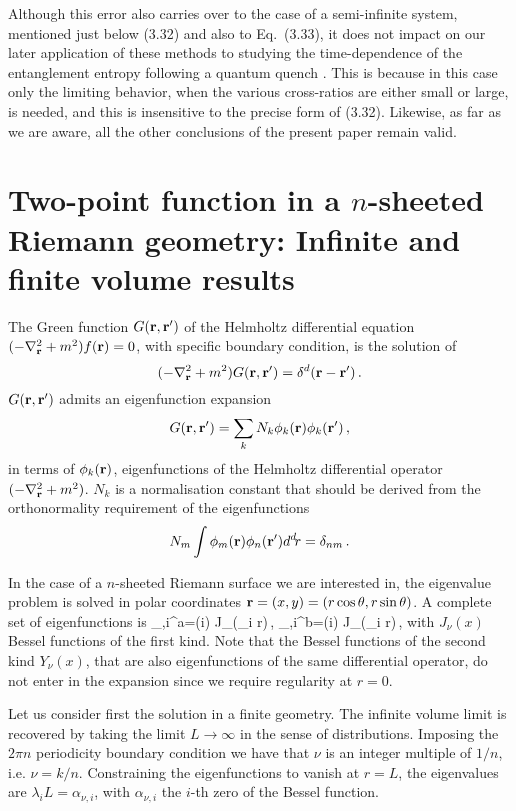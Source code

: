 \documentclass[12pt,aps,nofootinbib]{revtex4-1}
\begin{document}
Although this error also carries over to the case of a
semi-infinite system, mentioned just below (3.32) and also to
Eq.~(3.33), it does not impact on our later application of these
methods to studying the time-dependence of the entanglement
entropy following a quantum quench \cite{cc3}. This is because in
this case only the limiting behavior, when the various
cross-ratios are either small or large, is needed, and this is
insensitive to the precise form of (3.32). Likewise, as far as we
are aware, all the other conclusions of the present paper remain
valid.




\appendix

\section{Two-point function in a $n$-sheeted Riemann geometry:
Infinite and finite volume results}

The Green function $G({\bf r,r'})$ of the Helmholtz differential equation
$(-\nabla^2_{\bf r}+m^2)f({\bf r})=0$, with specific boundary condition,
is the solution of
$$
(-\nabla^2_{\bf r}+m^2)G({\bf r,r'})=\delta^d({\bf r-r'})\,.
$$
$G({\bf r,r'})$ admits an eigenfunction expansion
$$
G({\bf r,r'})=\sum_k N_k \phi_k({\bf r}) \phi_k({\bf r'})\,,
$$
in terms of $\phi_k({\bf r})$, eigenfunctions of the Helmholtz differential
operator $(-\nabla^2_{\bf r}+m^2)$.
$N_k$ is a  normalisation constant that should be derived from the
orthonormality requirement of the eigenfunctions
$$
N_m\int \phi_m({\bf r})\phi_n({\bf r'})d^d\!r=\delta_{nm}\,.
$$

In the case of a $n$-sheeted Riemann surface we are interested in,
the eigenvalue problem is solved in polar coordinates
${\bf r}=(x,y)=(r\cos\theta,r\sin\theta)$.
A complete set of eigenfunctions is
\be
\phi_{\nu,i}^a=\cos({i\nu \theta}) J_\nu(\lambda_i r)\,,\qquad
\phi_{\nu,i}^b=\sin({i\nu \theta}) J_\nu(\lambda_i r)\,,
\ee
with $J_\nu(x)$ Bessel functions of the first kind.
Note that the Bessel functions of the second kind $Y_\nu(x)$, that are also
eigenfunctions of the same differential operator, do not enter in
the expansion since we require regularity at $r=0$.

Let us consider first the solution in a finite geometry.
The infinite volume limit is recovered by taking the limit
$L\rightarrow \infty$ in the sense of distributions.
Imposing the $2\pi n$ periodicity boundary condition we have that $\nu$ is
an integer multiple of $1/n$, i.e. $\nu=k/n$.
Constraining the eigenfunctions to vanish at $r=L$, the eigenvalues
are $\lambda_i L=\alpha_{\nu,i}$, with $\alpha_{\nu,i}$ the $i$-th zero of
the Bessel function.
\end{document}
